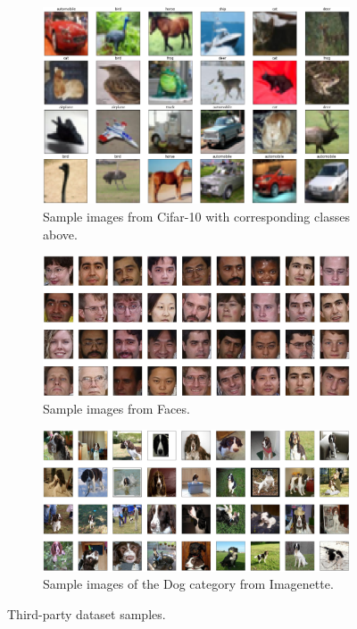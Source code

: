 \documentclass{l4proj}
\begin{document}
\begin{figure}
    \centering
    \begin{subfigure}[b]{1.0\textwidth}
        \includegraphics[width=\textwidth]{images/cifar10.PNG}
        \caption{Sample images from Cifar-10 with corresponding classes above.}
        \label{fig:cifar10}
        \vspace*{5mm}
    \end{subfigure}
    \begin{subfigure}[b]{1.0\textwidth}
        \includegraphics[width=\textwidth]{images/celeb_faces.PNG}
        \caption{Sample images from Faces.}
        \label{fig:celebfaces}
        \vspace*{5mm}
    \end{subfigure}
    \begin{subfigure}[b]{1.0\textwidth}
        \includegraphics[width=\textwidth]{images/imagenette.PNG}
        \caption{Sample images of the Dog category from Imagenette.}
        \label{fig:imagenette}
    \end{subfigure}
    \caption{Third-party dataset samples.}
    \label{fig:datasets}
\end{figure}
\end{document}
